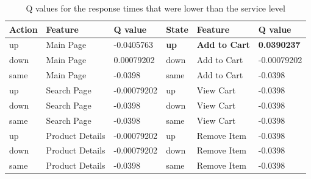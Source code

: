 \documentclass{bmcart}
\begin{document}
\begin{table}[]
\centering
\caption{Q values for the response times that were lower than the service level}
\label{tab:opencartlearning1}
\begin{tabular}{|l|l|l|l|l|l|}
\hline
\rowcolor[HTML]{EFEFEF} 
\textbf{Action} & \textbf{Feature} & \textbf{Q value} & \textbf{State}                      & \textbf{Feature}                             & \textbf{Q value}                          \\ \hline
up              & Main Page        & -0.0405763        & \cellcolor[HTML]{EFEFEF}\textbf{up} & \cellcolor[HTML]{EFEFEF}\textbf{Add to Cart} & \cellcolor[HTML]{EFEFEF}\textbf{0.0390237} \\ \hline
down            & Main Page        & 0.00079202        & down                                & Add to Cart                                  & -0.00079202                                \\ \hline
same            & Main Page        & -0.0398           & same                                & Add to Cart                                  & -0.0398                                    \\ \hline
up              & Search Page      & -0.00079202       & up                                  & View Cart                                    & -0.0398                                    \\ \hline
down            & Search Page      & -0.0398           & down                                & View Cart                                    & -0.0398                                    \\ \hline
same            & Search Page      & -0.0398           & same                                & View Cart                                    & -0.0398                                    \\ \hline
up              & Product Details   & -0.00079202       & up                                  & Remove Item                                  & -0.0398                                    \\ \hline
down            & Product Details   & -0.00079202       & down                                & Remove Item                                  & -0.0398                                    \\ \hline
same            & Product Details   & -0.0398           & same                                & Remove Item                                  & -0.0398                                    \\ \hline
\end{tabular}
\end{table}
\end{document}
